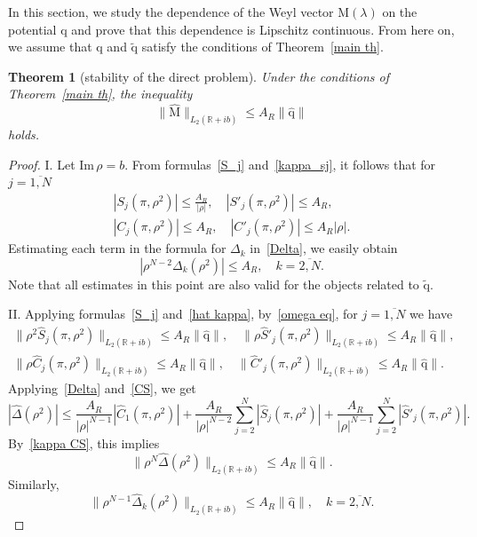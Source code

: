 \documentclass[a4paper, 12pt] {article}
\theoremstyle{plain}
\newtheorem{theorem}{\indent Theorem}
\theoremstyle{remark}
\theoremstyle{plain}
\theoremstyle{definition}
\numberwithin{equation}{section}
\begin{document}
In this section, we study the dependence of the Weyl vector $\mathrm{M}(\lambda)$
on the potential ${\mathrm q}$ and prove that this dependence is Lipschitz continuous. From here on, we assume that $\mathrm q$ and $\tilde {\mathrm q}$ satisfy the conditions of Theorem~\ref{main th}.

\begin{theorem}[stability of the direct problem] \label{th dir}
Under the conditions of Theorem~\ref{main th}, the inequality
$$\|\mathrm{\hat M}\|_{L_2({\mathbb R}+ib)} \le A_{R} \| \mathrm{\hat q}\|$$
holds. 
\end{theorem}
 \begin{proof}
 I. Let $\mathrm{Im}\,\rho = b.$ From formulas~\eqref{S_j} and~\eqref{kappa_sj}, it follows that for $j=\overline{1, N}$ 
\begin{equation} \label{CS} 
\begin{split} 
|S_j(\pi, \rho^2)| \le \frac{A_R}{|\rho |}, \quad |S'_j(\pi, \rho^2)| \le A_R, \\[2mm] 
|C_j(\pi, \rho^2)| \le A_R, \quad |C'_j(\pi, \rho^2)| \le A_R |\rho|. 
\end{split}
\end{equation}
Estimating each term in the formula for $\Delta_k$ in~\eqref{Delta},  we easily obtain
\begin{equation}|\rho^{N-2}\Delta_k(\rho^2)| \le A_R, \quad k=\overline{2, N}.
\label{Delta_k est}
\end{equation}
Note that all estimates in this point are also valid for the objects related to $\tilde{\mathrm q}.$

II. Applying formulas~\eqref{S_j} and~\eqref{hat kappa}, by~\eqref{omega eq}, for $j=\overline{1, N}$ we have
\begin{equation} \label{kappa CS}
\begin{split}
\|\rho^2 \hat S_j(\pi, \rho^2)\|_{L_2(\mathbb R + ib)} \le A_R \| \mathrm{\hat q}\|, \quad \|\rho \hat S'_j(\pi, \rho^2)\|_{L_2(\mathbb R + ib)} \le A_R \| \mathrm{\hat q}\|, \\[2mm] 
\|\rho \hat C_j(\pi, \rho^2)\|_{L_2(\mathbb R + ib)} \le A_R \| \mathrm{\hat q}\|, \quad \|\hat C'_j(\pi, \rho^2)\|_{L_2(\mathbb R + ib)} \le A_R \| \mathrm{\hat q}\|. 
\end{split} 
\end{equation} 
Applying~\eqref{Delta} and~\eqref{CS}, we get 
$$|\hat \Delta(\rho^2)| \le \frac{A_R}{|\rho|^{N-1}}|\hat C_1(\pi, \rho^2)| + \frac{A_R}{|\rho|^{N-2}} \sum_{j=2}^N |\hat S_j(\pi, \rho^2)| + \frac{A_R}{|\rho|^{N-1}} \sum_{j=2}^N |\hat S'_j(\pi, \rho^2)|.$$
By~\eqref{kappa CS}, this implies
\begin{equation*}
\| \rho^{N}\hat \Delta(\rho^2)\|_{L_2(\mathbb R + ib)} \le A_R \| \mathrm{\hat q}\|.
\end{equation*}
Similarly,
\begin{equation*}
\| \rho^{N-1}\hat \Delta_k(\rho^2)\|_{L_2(\mathbb R + ib)} \le A_R \| \mathrm{\hat q}\|, \quad k=\overline{2, N}. 
\end{equation*}


\end{proof}
\end{document}
